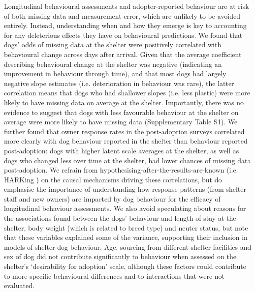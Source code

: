 \documentclass[fleqn,10pt]{wlscirep}
\begin{document}
Longitudinal behavioural assessments and adopter-reported behaviour are at risk of both missing data and measurement error, which are unlikely to be avoided entirely. Instead, understanding when and how they emerge is key to accounting for any deleterious effects they have on behavioural predictions. We found that dogs' odds of missing data at the shelter were positively correlated with behavioural change across days after arrival. Given that the average coefficient describing behavioural change at the shelter was negative (indicating an improvement in behaviour through time), and that most dogs had largely negative slope estimates (i.e. deterioration in behaviour was rare), the latter correlation means that dogs who had shallower slopes (i.e. less plastic) were more likely to have missing data on average at the shelter. Importantly, there was no evidence to suggest that dogs with less favourable behaviour at the shelter on average were more likely to have missing data (Supplementary Table S1). We further found that owner response rates in the post-adoption surveys correlated more clearly with dog behaviour reported in the shelter than behaviour reported post-adoption: dogs with higher latent scale averages at the shelter, as well as dogs who changed less over time at the shelter, had lower chances of missing data post-adoption. We refrain from hypothesising-after-the-results-are-known (i.e. HARKing \cite{kerr1998}) on the causal mechanisms driving these correlations, but do emphasise the importance of understanding how response patterns (from shelter staff and new owners) are impacted by dog behaviour for the efficacy of longitudinal behaviour assessments. We also avoid speculating about reasons for the associations found between the dogs' behaviour and length of stay at the shelter, body weight (which is related to breed type) and neuter status, but note that these variables explained some of the variance, supporting their inclusion in models of shelter dog behaviour. Age, sourcing from different shelter facilities and sex of dog did not contribute significantly to behaviour when assessed on the shelter's `desirability for adoption' scale, although these factors could contribute to more specific behavioural differences and to interactions that were not evaluated.
\end{document}
